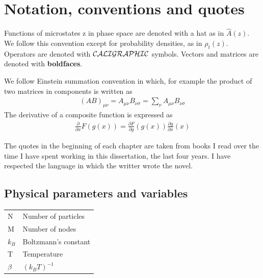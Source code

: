 \documentclass[a4paper,openright,12pt]{book}
\begin{document}
\chapter{Notation, conventions and quotes}\label{Ap:Notation}

Functions of microstates z in phase space are denoted with a hat as in $\hat{A}(z)$. We follow this convention except for probability densities, as in $\rho_t(z)$. Operators are denoted with ${\cal CALIGRAPHIC}$ symbols. Vectors and matrices are denoted with {\bf boldfaces}.


We follow Einstein summation convention in which, for example the product of two matrices in components is written as
\begin{align}
    (AB)_{\mu\nu} = A_{\mu\nu}B_{\nu\sigma}=\sum_{\nu}A_{\mu\nu}B_{\nu\sigma}
\end{align}
The derivative of a composite function is expressed as
\begin{align}
    \frac{\partial}{\partial x}F(g(x))=\frac{\partial F}{\partial g}(g(x))\frac{\partial g}{\partial x}(x)
\end{align}

The quotes in the beginning of each chapter are taken from books I read over the time I have spent working in this dissertation, the last four years. I have respected the language in which the writter wrote the novel.



\section*{Physical parameters and variables}
\begin{tabular}{l l}
    N & Number of particles \\
    M & Number of nodes \\
    $k_B$ & Boltzmann's constant \\
    T & Temperature \\
    $\beta$ & $(k_BT)^{-1}$ \\
\end{tabular}
\end{document}
